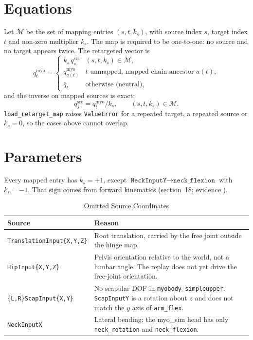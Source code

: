 \documentclass[11pt,a4paper]{article}
\begin{document}
\section{Equations}

Let $\mathcal{M}$ be the set of mapping entries $(s, t, k_s)$, with source
index $s$, target index $t$ and non-zero multiplier $k_s$. The map is required
to be one-to-one: no source and no target appears twice. The retargeted vector
is
\begin{equation}
  q^{\mathrm{myo}}_t =
  \begin{cases}
    k_s\, q^{\mathrm{src}}_s & (s,t,k_s)\in\mathcal{M},\\
    q^{\mathrm{myo}}_{a(t)} & t \text{ unmapped, mapped chain ancestor } a(t),\\
    \bar q_t & \text{otherwise (neutral)},
  \end{cases}
\end{equation}
and the inverse on mapped sources is exact:
\begin{equation}
  q^{\mathrm{src}}_s = q^{\mathrm{myo}}_t / k_s, \qquad (s,t,k_s)\in\mathcal{M}.
\end{equation}
\texttt{load\_retarget\_map} raises \texttt{ValueError} for a repeated target,
a repeated source or $k_s=0$, so the cases above cannot overlap.

\section{Parameters}

Every mapped entry has $k_s=+1$, except $\texttt{NeckInputY}\to
\texttt{neck\_flexion}$ with $k_s=-1$. That sign comes from forward
kinematics (section~18; evidence
).

\begin{table}[h]
\centering
\caption{Omitted Source Coordinates}
\begin{tabularx}{\linewidth}{@{}lX@{}}
\toprule
Source & Reason \\
\midrule
\texttt{TranslationInput\{X,Y,Z\}} & Root translation, carried by the free joint outside the hinge map. \\
\texttt{HipInput\{X,Y,Z\}} & Pelvis orientation relative to the world, not a lumbar angle. The replay does not yet drive the free-joint orientation. \\
\texttt{\{L,R\}ScapInput\{X,Y\}} & No scapular DOF in \texttt{myobody\_simpleupper}. \texttt{ScapInputY} is a rotation about $z$ and does not match the $y$ axis of \texttt{arm\_flex}. \\
\texttt{NeckInputX} & Lateral bending; the myo\_sim head has only \texttt{neck\_rotation} and \texttt{neck\_flexion}. \\
\bottomrule
\end{tabularx}
\end{table}
\end{document}
